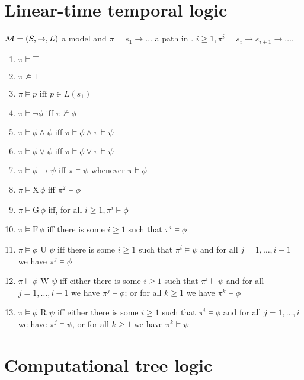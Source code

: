 \documentclass[10pt,a4paper]{article}
\begin{document}
\newpage

\section*{Linear-time temporal logic}

$\mathcal{M} = (S, \to, L)$ a model and $\pi = s_1 \to \dots$ a path in \model. $i≥1, \pi^i = s_i \to s_{i+1} \to \dots$.

\renewcommand{\iff}{\ensuremath{\text{ iff }}}

\newcommand{\X}{\ensuremath{\text{X}\,}}
\newcommand{\G}{\ensuremath{\text{G}\,}}
\newcommand{\F}{\ensuremath{\text{F}\,}}

\begin{enumerate}
  \item $\pi \models \top$
  \item $\pi \not\models \bot$
  \item $\pi \models p \iff p \in L(s_1)$
  \item $\pi \models \neg \phi \iff \pi \not\models \phi$
  \item $\pi \models \phi \land \psi \iff \pi \models \phi \land \pi \models \psi$
  \item $\pi \models \phi \lor \psi \iff \pi \models \phi \lor \pi \models \psi$
  \item $\pi \models \phi \to \psi$ iff $\pi \models \psi$ whenever $\pi \models \phi$
  \item $\pi \models \X \phi$ iff $\pi^2 \models \phi$
  \item $\pi \models \G \phi$ iff, for all $i ≥ 1, \pi^i \models \phi$
  \item $\pi \models \F \phi$ iff there is some $i ≥ 1$ such that $\pi^i \models \phi$
  \item $\pi \models \phi \text{ U } \psi$ iff there is some $i ≥ 1$ such that $\pi^i \models \psi$ and for all $j = 1,\dots, i-1$ we have $\pi^j \models \phi$
  \item $\pi \models \phi \text{ W } \psi$ iff either there is some $i ≥ 1$ such that $\pi^i \models \psi$ and for all $j = 1, \dots, i-1$ we have $\pi^j \models \phi$; or for all $k ≥ 1$ we have $\pi^k \models \phi$
  \item $\pi \models \phi \text{ R } \psi$ iff either there is some $i ≥ 1$ such that $\pi^i \models \phi$ and for all $j=1,\dots,i$ we have $\pi^j \models \psi$, or for all $k≥1$ we have $\pi^k \models \psi$
\end{enumerate}


\section*{Computational tree logic}
\end{document}
